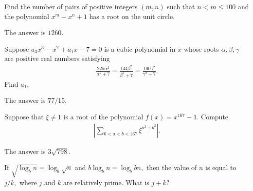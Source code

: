 \documentclass[11pt]{article}
\theoremstyle{definition}
\begin{document}
\begin{question}[name={2022-23 CHMMC Winter, Individual Round, Problem 10}]
	Find the number of pairs of positive integers $(m,n)$ such that $n < m \leq 100$ and the polynomial $x^m+x^n+1$ has a root on the unit circle.
\end{question}


\begin{solution}%
	The answer is $\boxed{1260}$.
\end{solution}



\begin{question}[name={2022-23 CHMMC Winter, Team Round, Problem 8}]
	Suppose $a_3x^3-x^2+a_1x-7=0$ is a cubic polynomial in $x$ whose roots $\alpha,\beta,\gamma$ are positive real numbers satisfying
	\begin{align*}
		\frac{225\alpha^2}{\alpha^2+7}=\frac{144\beta^2}{\beta^2+7}=\frac{100\gamma^2}{\gamma^2+7}.
	\end{align*}
	Find $a_1$.
\end{question}


\begin{solution}%
	The answer is $\boxed{77/15}$.
\end{solution}


\begin{question}[name={2022-23 CHMMC Winter, Team Round, Problem 10}]
	Suppose that $\xi \neq 1$ is a root of the polynomial $f(x)=x^{167}-1$. Compute
	\begin{align*}
		\left| \sum_{0<a<b<167} \xi^{a^2+b^2}\right|.
	\end{align*}
\end{question}


\begin{solution}%
	The answer is $\boxed{3\sqrt{798}}$.
\end{solution}







\begin{question}[name={2023 AIME I, \href{https://artofproblemsolving.com/community/c4p27048897}{Problem 2}}]
	If $\sqrt{\log_bn}=\log_b\sqrt n$ and $b\log_bn=\log_bbn,$ then the value of $n$ is equal to $j/k,$ where $j$ and $k$ are relatively prime. What is $j+k$?
\end{question}


%	
\end{document}
